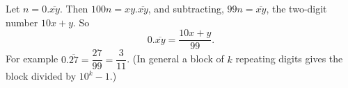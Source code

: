 Let $n=0.\overline{xy}$. Then $100n=xy.\overline{xy}$, and subtracting, $99n=\overline{xy}$, the two-digit number $10x+y$. So
\[0.\overline{xy}=\dfrac{10x+y}{99}.\]
For example $0.\overline{27}=\dfrac{27}{99}=\boxed{\dfrac3{11}}$. (In general a block of $k$ repeating digits gives the block divided by $10^k-1$.)
